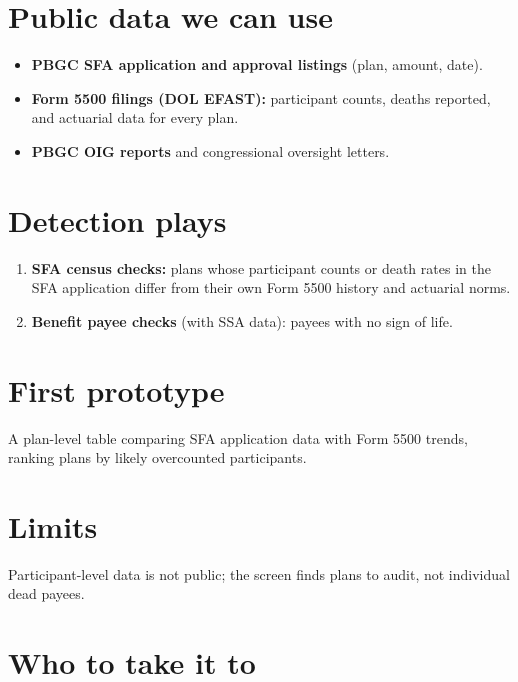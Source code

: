 \documentclass[letterpaper,11pt]{article}
\providecommand{\tightlist}{\setlength{\itemsep}{0pt}\setlength{\parskip}{0pt}}
\begin{document}
\hypertarget{public-data-we-can-use}{%
\section{Public data we can use}\label{public-data-we-can-use}}

\begin{itemize}
\tightlist
\item
  \textbf{PBGC SFA application and approval listings} (plan, amount,
  date).
\item
  \textbf{Form 5500 filings (DOL EFAST):} participant counts, deaths
  reported, and actuarial data for every plan.
\item
  \textbf{PBGC OIG reports} and congressional oversight letters.
\end{itemize}

\hypertarget{detection-plays}{%
\section{Detection plays}\label{detection-plays}}

\begin{enumerate}
\def\labelenumi{\arabic{enumi}.}
\tightlist
\item
  \textbf{SFA census checks:} plans whose participant counts or death
  rates in the SFA application differ from their own Form 5500 history
  and actuarial norms.
\item
  \textbf{Benefit payee checks} (with SSA data): payees with no sign of
  life.
\end{enumerate}

\hypertarget{first-prototype}{%
\section{First prototype}\label{first-prototype}}

A plan-level table comparing SFA application data with Form 5500 trends,
ranking plans by likely overcounted participants.

\hypertarget{limits}{%
\section{Limits}\label{limits}}

Participant-level data is not public; the screen finds plans to audit,
not individual dead payees.

\hypertarget{who-to-take-it-to}{%
\section{Who to take it to}\label{who-to-take-it-to}}
\end{document}
